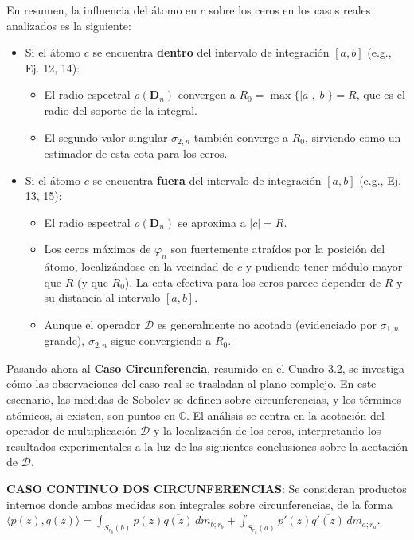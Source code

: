 En resumen, la influencia del átomo en $c$ sobre los ceros en los casos reales analizados es la siguiente:
\begin{itemize}
	\item Si el átomo $c$ se encuentra \textbf{dentro} del intervalo de integración $[a,b]$ (e.g., Ej. 12, 14):
	      \begin{itemize}
		      \item El radio espectral $\rho(\mathbf{D}_n)$ convergen a $R_0 = \max\{|a|,|b|\} = R$, que es el radio del soporte de la integral.
		      \item El segundo valor singular $\sigma_{2,n}$ también converge a $R_0$, sirviendo como un estimador de esta cota para los ceros.
	      \end{itemize}
	\item Si el átomo $c$ se encuentra \textbf{fuera} del intervalo de integración $[a,b]$ (e.g., Ej. 13, 15):
	      \begin{itemize}
		      \item El radio espectral $\rho(\mathbf{D}_n)$ se aproxima a $|c|=R$.
		      \item Los ceros máximos de $\varphi_n$ son fuertemente atraídos por la posición del átomo, localizándose en la vecindad de $c$ y pudiendo tener módulo mayor que $R$ (y que $R_0$). La cota efectiva para los ceros parece depender de $R$ y su distancia al intervalo $[a,b]$.
		      \item Aunque el operador $\mathcal{D}$ es generalmente no acotado (evidenciado por $\sigma_{1,n}$ grande), $\sigma_{2,n}$ sigue convergiendo a $R_0$.
	      \end{itemize}
\end{itemize}

Pasando ahora al \textbf{Caso Circunferencia}, resumido en el Cuadro 3.2, se investiga cómo las observaciones del caso real se trasladan al plano complejo. En este escenario, las medidas de Sobolev se definen sobre circunferencias, y los términos atómicos, si existen, son puntos en $\mathbb{C}$. El análisis se centra en la acotación del operador de multiplicación $\mathcal{D}$ y la localización de los ceros, interpretando los resultados experimentales a la luz de las siguientes conclusiones sobre la acotación de $\mathcal{D}$.

\noindent \textbf{CASO CONTINUO DOS CIRCUNFERENCIAS}: Se consideran productos internos donde ambas medidas son integrales sobre circunferencias, de la forma $\langle p(z),q(z) \rangle=\int_{S_{r_b}(b)} p(z)\overline{q(z)}\, dm_{b;r_b} + \int_{S_{r_a}(a)} p'(z)\overline{q'(z)}\, dm_{a;r_a}$.


